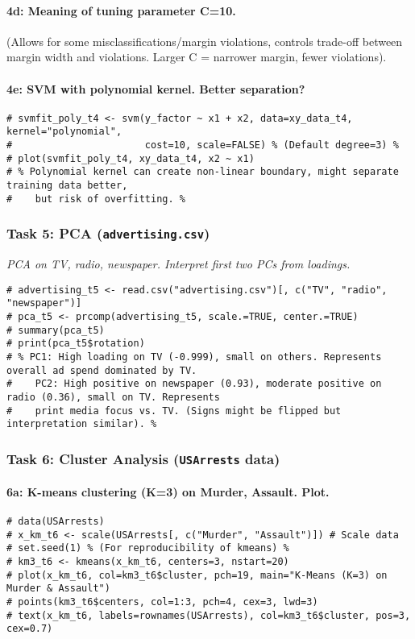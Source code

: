 \documentclass[12pt,a4paper]{article}
\newcommand{\Robject}[1]{\texttt{#1}} %
\begin{document}
            \paragraph{4d: Meaning of tuning parameter C=10.} (Allows for some misclassifications/margin violations, controls trade-off between margin width and violations. Larger C = narrower margin, fewer violations).
            \paragraph{4e: SVM with polynomial kernel. Better separation?}
\begin{lstlisting}
# svmfit_poly_t4 <- svm(y_factor ~ x1 + x2, data=xy_data_t4, kernel="polynomial", 
#                       cost=10, scale=FALSE) % (Default degree=3) %
# plot(svmfit_poly_t4, xy_data_t4, x2 ~ x1)
# % Polynomial kernel can create non-linear boundary, might separate training data better,
#    but risk of overfitting. %
\end{lstlisting}

        \subsubsection{Task 5: PCA (\Robject{advertising.csv})}
            \textit{PCA on TV, radio, newspaper. Interpret first two PCs from loadings.}
\begin{lstlisting}
# advertising_t5 <- read.csv("advertising.csv")[, c("TV", "radio", "newspaper")]
# pca_t5 <- prcomp(advertising_t5, scale.=TRUE, center.=TRUE)
# summary(pca_t5)
# print(pca_t5$rotation)
# % PC1: High loading on TV (-0.999), small on others. Represents overall ad spend dominated by TV.
#    PC2: High positive on newspaper (0.93), moderate positive on radio (0.36), small on TV. Represents
#    print media focus vs. TV. (Signs might be flipped but interpretation similar). %
\end{lstlisting}

        \subsubsection{Task 6: Cluster Analysis (\Robject{USArrests} data)}
            \paragraph{6a: K-means clustering (K=3) on Murder, Assault. Plot.}
\begin{lstlisting}
# data(USArrests)
# x_km_t6 <- scale(USArrests[, c("Murder", "Assault")]) # Scale data
# set.seed(1) % (For reproducibility of kmeans) %
# km3_t6 <- kmeans(x_km_t6, centers=3, nstart=20)
# plot(x_km_t6, col=km3_t6$cluster, pch=19, main="K-Means (K=3) on Murder & Assault")
# points(km3_t6$centers, col=1:3, pch=4, cex=3, lwd=3)
# text(x_km_t6, labels=rownames(USArrests), col=km3_t6$cluster, pos=3, cex=0.7)
\end{lstlisting}
\end{document}
